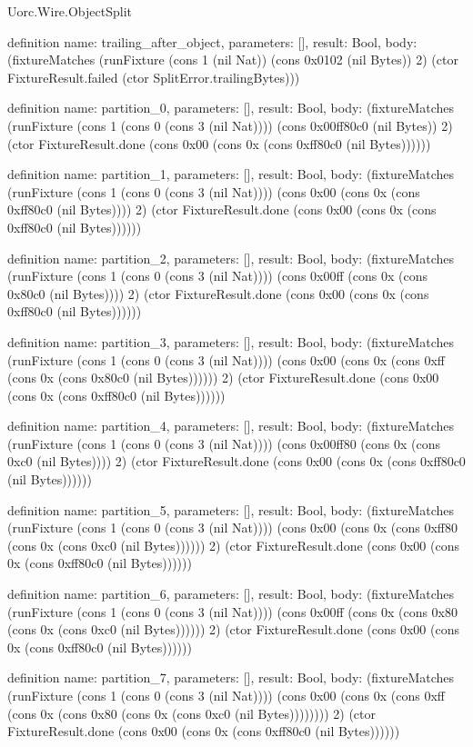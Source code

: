 \begin{lexlean}{Uorc.Wire.ObjectSplit}
\begin{semanticmodule}
definition{
  name: trailing_after_object,
  parameters: [],
  result: Bool,
  body: (fixtureMatches (runFixture (cons 1 (nil Nat)) (cons 0x0102 (nil Bytes)) 2) (ctor FixtureResult.failed (ctor SplitError.trailingBytes)))
}

definition{
  name: partition_0,
  parameters: [],
  result: Bool,
  body: (fixtureMatches (runFixture (cons 1 (cons 0 (cons 3 (nil Nat)))) (cons 0x00ff80c0 (nil Bytes)) 2) (ctor FixtureResult.done (cons 0x00 (cons 0x (cons 0xff80c0 (nil Bytes))))))
}

definition{
  name: partition_1,
  parameters: [],
  result: Bool,
  body: (fixtureMatches (runFixture (cons 1 (cons 0 (cons 3 (nil Nat)))) (cons 0x00 (cons 0x (cons 0xff80c0 (nil Bytes)))) 2) (ctor FixtureResult.done (cons 0x00 (cons 0x (cons 0xff80c0 (nil Bytes))))))
}

definition{
  name: partition_2,
  parameters: [],
  result: Bool,
  body: (fixtureMatches (runFixture (cons 1 (cons 0 (cons 3 (nil Nat)))) (cons 0x00ff (cons 0x (cons 0x80c0 (nil Bytes)))) 2) (ctor FixtureResult.done (cons 0x00 (cons 0x (cons 0xff80c0 (nil Bytes))))))
}

definition{
  name: partition_3,
  parameters: [],
  result: Bool,
  body: (fixtureMatches (runFixture (cons 1 (cons 0 (cons 3 (nil Nat)))) (cons 0x00 (cons 0x (cons 0xff (cons 0x (cons 0x80c0 (nil Bytes)))))) 2) (ctor FixtureResult.done (cons 0x00 (cons 0x (cons 0xff80c0 (nil Bytes))))))
}

definition{
  name: partition_4,
  parameters: [],
  result: Bool,
  body: (fixtureMatches (runFixture (cons 1 (cons 0 (cons 3 (nil Nat)))) (cons 0x00ff80 (cons 0x (cons 0xc0 (nil Bytes)))) 2) (ctor FixtureResult.done (cons 0x00 (cons 0x (cons 0xff80c0 (nil Bytes))))))
}

definition{
  name: partition_5,
  parameters: [],
  result: Bool,
  body: (fixtureMatches (runFixture (cons 1 (cons 0 (cons 3 (nil Nat)))) (cons 0x00 (cons 0x (cons 0xff80 (cons 0x (cons 0xc0 (nil Bytes)))))) 2) (ctor FixtureResult.done (cons 0x00 (cons 0x (cons 0xff80c0 (nil Bytes))))))
}

definition{
  name: partition_6,
  parameters: [],
  result: Bool,
  body: (fixtureMatches (runFixture (cons 1 (cons 0 (cons 3 (nil Nat)))) (cons 0x00ff (cons 0x (cons 0x80 (cons 0x (cons 0xc0 (nil Bytes)))))) 2) (ctor FixtureResult.done (cons 0x00 (cons 0x (cons 0xff80c0 (nil Bytes))))))
}

definition{
  name: partition_7,
  parameters: [],
  result: Bool,
  body: (fixtureMatches (runFixture (cons 1 (cons 0 (cons 3 (nil Nat)))) (cons 0x00 (cons 0x (cons 0xff (cons 0x (cons 0x80 (cons 0x (cons 0xc0 (nil Bytes)))))))) 2) (ctor FixtureResult.done (cons 0x00 (cons 0x (cons 0xff80c0 (nil Bytes))))))
}


\end{semanticmodule}
\end{lexlean}
